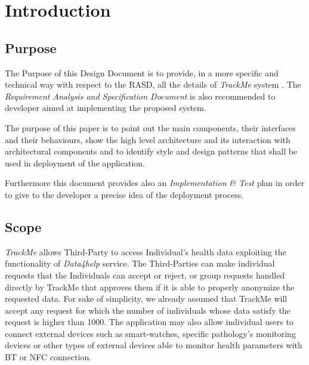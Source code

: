 \documentclass[a4paper]{article}
\begin{document}

\tableofcontents
{}

\newpage
\pagestyle{fancy}

\section{Introduction}
\subsection{Purpose}
    The Purpose of this Design Document is to provide, in a more specific and technical way with respect to the RASD, all the details of \textit{TrackMe} system \cite{rasd}. The \textit{Requirement Analysis and Specification Document} is also recommended to developer aimed at implementing the proposed system.
    
    The purpose of this paper is to point out the main components, their interfaces and their behaviours, show the high level architecture and its interaction with architectural components and to identify style and design patterns that shall be used in deployment of the application.
    
    Furthermore this document provides also an \textit{Implementation \& Test} plan in order to give to the developer a precise idea of the deployment process.
 
\subsection{Scope}
   \textit{TrackMe} allows Third-Party to access Individual's health data exploiting the functionality of \textit{Data4help} service. The Third-Parties can make individual requests that the Individuals can accept or reject, or group requests handled directly by TrackMe that approves them if it is able to properly anonymize the requested data. For sake of simplicity, we already assumed that TrackMe will accept any request for which the number of individuals whose data satisfy the request is higher than 1000. The application may also allow individual users to connect external devices such as smart-watches, specific pathology's monitoring devices or other types of external devices able to monitor health parameters with BT or NFC connection.
\end{document}
